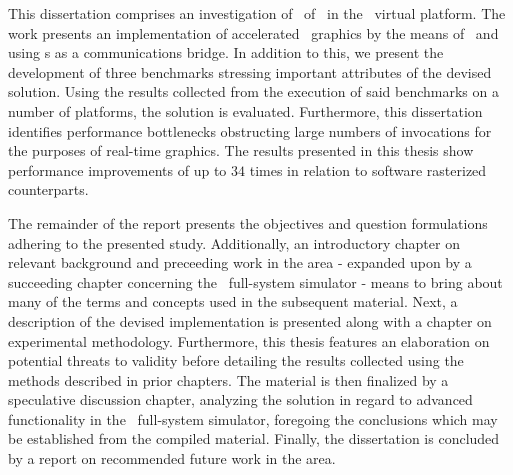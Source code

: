 This dissertation comprises an investigation of \dvttermparavirtualization\ of \dvttermopengles\ in the \dvttermsimics\ virtual platform.
The work presents an implementation of accelerated \dvttermopenglestwopointo\ graphics by the means of \dvttermparavirtualization\ and using \dvttermmagicinstruction s as a communications bridge.
In addition to this, we present the development of three benchmarks stressing important attributes of the devised solution.
Using the results collected from the execution of said benchmarks on a number of platforms, the solution is evaluated.
Furthermore, this dissertation identifies performance bottlenecks obstructing large numbers of  invocations for the purposes of real-time graphics.
The results presented in this thesis show performance improvements of up to $34$ times in relation to software rasterized counterparts.

The remainder of the report presents the objectives and question formulations adhering to the presented study.
Additionally, an introductory chapter on relevant background and preceeding work in the area - expanded upon by a succeeding chapter concerning the \dvttermsimics\ full-system simulator - means to bring about many of the terms and concepts used in the subsequent material.
Next, a description of the devised  implementation is presented along with a chapter on experimental methodology.
Furthermore, this thesis features an elaboration on potential threats to validity before detailing the results collected using the methods described in prior chapters.
The material is then finalized by a speculative discussion chapter, analyzing the  solution in regard to advanced functionality in the \dvttermsimics\ full-system simulator, foregoing the conclusions which may be established from the compiled material.
Finally, the dissertation is concluded by a report on recommended future work in the area.
